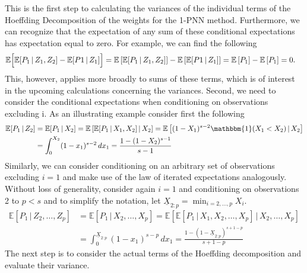 \documentclass[letterpaper,10pt]{article}
\numberwithin{equation}{section}
\numberwithin{thm}{section}
\numberwithin{lem}{section}
\numberwithin{cor}{section}
\newcommand{\E}{\mathbb{E}}
\newcommand{\1}{\mathbb{1}}
\begin{document}
This is the first step to calculating the variances of the individual terms of the Hoeffding Decomposition of the weights for the 1-PNN method.
Furthermore, we can recognize that the expectation of any sum of these conditional expectations has expectation equal to zero.
For example, we can find the following
\begin{equation*}
	\begin{aligned}
		\E\Bigl[\E[P_1 \, | \, Z_1, Z_2] - \E[P1 \, | \, Z_1]\Bigr]
		 & = \E\left[\E[P_1 \, | \, Z_1, Z_2]\right] - \E\left[\E[P1 \, | \, Z_1]\right]
		= \E\left[P_1\right] - \E\left[P_1\right]
		= 0.
	\end{aligned}
\end{equation*}
This, however, applies more broadly to sums of these terms, which is of interest in the upcoming calculations concerning the variances.
Second, we need to consider the conditional expectations when conditioning on observations excluding i.
As an illustrating example consider first the following
\begin{equation*}
	\begin{aligned}
		\mathbb{E}[P_1 \, | \, Z_2]
		 & = \mathbb{E}[P_1 \, | \, X_2]
		= \mathbb{E}\left[\mathbb{E}[P_1 \, | \, X_1, X_2] \, | \, X_2\right]
		= \mathbb{E}\left[(1 - X_1)^{s-2} \mathbbm{1}(X_1 < X_2) \, | \, X_2\right] \\
		 & = \int_{0}^{X_2}(1 - x_1)^{s-2} \, dx_1
		= \frac{1 - (1-X_2)^{s-1}}{s-1}
	\end{aligned}
\end{equation*}
Similarly, we can consider conditioning on an arbitrary set of observations excluding $i=1$ and make use of the law of iterated expectations analogously.
Without loss of generality, consider again $i = 1$ and conditioning on observations 2 to $p < s$ and to simplify the notation, let $\underline{X}_{2:p} = \min_{i = 2, \dotsc, p} X_i$.
\begin{equation*}
	\begin{aligned}
		\mathbb{E}[P_1 \, | \, Z_2, \dotsc, Z_p]
		 & = \mathbb{E}[P_1 \, | \, X_2, \dotsc, X_p]
		= \mathbb{E}\left[\mathbb{E}\left[P_1 \, | \, X_1, X_2, \dotsc, X_p\right] \, | \, X_2, \dotsc, X_p\right] \\
		 & = \int_{0}^{\underline{X}_{2:p}}(1 - x_1)^{s-p} \, d x_1
		= \frac{1 - (1 - \underline{X}_{2:p})^{s+1-p}}{s + 1 - p}
	\end{aligned}
\end{equation*}
The next step is to consider the actual terms of the Hoeffding decomposition and evaluate their variance.
\end{document}
